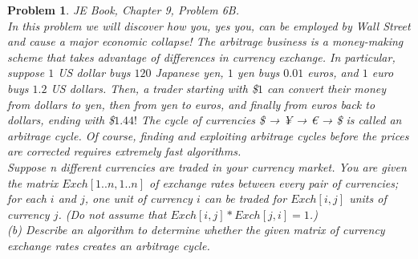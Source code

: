 \documentclass[12pt]{article}
\newtheorem{problem}{Problem}
\begin{document}
\hrulefill %

\begin{problem}
 JE Book, Chapter 9, Problem 6B. \\
 \indent In this problem we will discover how you, yes you, can be employed by Wall Street and cause a major economic collapse! The arbitrage business is a money-making scheme that takes advantage of differences in currency exchange. In particular, suppose $1$ US dollar buys $120$ Japanese yen, $1$ yen buys $0.01$ euros, and $1$ euro buys $1.2$ US dollars. Then, a trader starting with \$$1$ can convert their money from dollars to yen, then from yen to euros, and finally from euros back to dollars, ending with \$$1.44!$ The cycle of currencies \$ → ¥ → € → \$ is called an arbitrage cycle. Of course, finding and exploiting arbitrage cycles before the prices are corrected requires extremely fast algorithms.
\\ \indent Suppose n different currencies are traded in your currency market. You are given the matrix $Exch[1 .. n, 1 .. n]$ of exchange rates between every pair of currencies; for each $i$ and $j$, one unit of currency $i$ can be traded for $Exch[i, j]$ units of currency $j$. (Do not assume that $Exch[i, j] * Exch[ j, i] = 1$.)
\\ \indent (b) Describe an algorithm to determine whether the given matrix of currency exchange rates creates an arbitrage cycle.
\end{problem}

\end{document}
